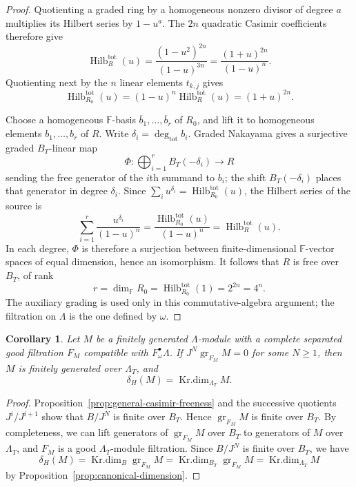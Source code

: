 \documentclass[11pt]{article}
\numberwithin{equation}{section}
\newtheorem{corollary}[theorem]{Corollary}
\theoremstyle{definition}
\theoremstyle{remark}
\newcommand{\F}{\mathbb F}
\DeclareMathOperator{\gr}{gr}
\DeclareMathOperator{\Krdim}{Kr.dim}
\begin{document}
\begin{proof}
Quotienting a graded ring by a homogeneous nonzero divisor of
degree $a$ multiplies its Hilbert series by $1-u^a$.
The $2n$ quadratic Casimir coefficients therefore give
\[
 \operatorname{Hilb}^{\mathrm{tot}}_{R}(u)
   =\frac{(1-u^2)^{2n}}{(1-u)^{3n}}
   =\frac{(1+u)^{2n}}{(1-u)^n}.
\]
Quotienting next by the $n$ linear elements $t_{k,j}$ gives
\[
 \operatorname{Hilb}^{\mathrm{tot}}_{R_0}(u)
   =(1-u)^n\operatorname{Hilb}^{\mathrm{tot}}_{R}(u)
   =(1+u)^{2n}.
\]

Choose a homogeneous $\F$-basis $\overline b_1,\ldots,\overline b_r$
of $R_0$, and lift it to homogeneous elements $b_1,\ldots,b_r$ of $R$.
Write $\delta_i=\deg_{\mathrm{tot}} b_i$. Graded Nakayama gives a surjective
graded $B_T$-linear map
\[
 \Phi:\bigoplus_{i=1}^r B_T(-\delta_i)\longrightarrow R
\]
sending the free generator of the $i$th summand to $b_i$;
the shift $B_T(-\delta_i)$ places that generator in degree $\delta_i$.
Since $\sum_i u^{\delta_i}=\operatorname{Hilb}^{\mathrm{tot}}_{R_0}(u)$, the
Hilbert series of the source is
\[
 \sum_{i=1}^r\frac{u^{\delta_i}}{(1-u)^n}
   =\frac{\operatorname{Hilb}^{\mathrm{tot}}_{R_0}(u)}{(1-u)^n}
   =\operatorname{Hilb}^{\mathrm{tot}}_{R}(u).
\]
In each degree, $\Phi$ is therefore a surjection between
finite-dimensional $\F$-vector spaces of equal dimension, hence
an isomorphism. It follows that $R$ is free over $B_T$, of rank
\[
 r=\dim_\F R_0=\operatorname{Hilb}^{\mathrm{tot}}_{R_0}(1)=2^{2n}=4^n.
\]
The auxiliary grading is used only in this commutative-algebra
argument; the filtration on $\Lambda$ is the one defined by $\omega$.
\end{proof}

\begin{corollary}\label{cor:general-casimir-finite-generation}
Let $M$ be a finitely generated $\Lambda$-module with a complete
separated good filtration $F_M$ compatible with
$F_\omega^\bullet\Lambda$. If
$J^N\gr_{F_M}M=0$ for some $N\geq1$, then $M$ is finitely
generated over $\Lambda_T$, and
\[
 \delta_H(M)=\Krdim_{\Lambda_T} M.
\]
\end{corollary}

\begin{proof}
Proposition~\ref{prop:general-casimir-freeness} and the successive
quotients $J^i/J^{i+1}$ show that $B/J^N$ is
finite over $B_T$. Hence $\gr_{F_M}M$ is finite over $B_T$.
By completeness, 
we can lift generators of $\gr_{F_M}M$ over $B_T$ to generators of
$M$ over $\Lambda_T$, and $F_M$ is a good $\Lambda_T$-module filtration.
Since $B/J^N$ is finite over $B_T$,
we have 
\[
 \delta_H(M)=\Krdim_{B}\gr_{F_M}M=\Krdim_{B_T}\gr_{F_M}M=\Krdim_{\Lambda_T} M
\]
by Proposition~\ref{prop:canonical-dimension}.
\end{proof}
\end{document}
